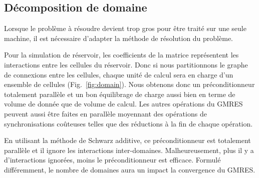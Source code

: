 \subsection{Décomposition de domaine}
Lorsque le problème à résoudre devient trop gros pour être traité sur une seule machine, il est nécessaire d'adapter la méthode de résolution du problème.

Pour la simulation de réservoir, les coefficients de la matrice représentent les interactions entre les cellules du réservoir.
%
Donc si nous partitionnons le graphe de connexions entre les cellules, chaque unité de calcul sera en charge d'un ensemble de cellules (Fig.~\ref{fig:domain}).
%
Nous obtenons donc un préconditionneur totalement parallèle et un bon équilibrage de charge aussi bien en terme de volume de donnée que de volume de calcul.
%
Les autres opérations du GMRES peuvent aussi être faites en parallèle moyennant des opérations de synchronisations coûteuses telles que des réductions à la fin de chaque opération.




En utilisant la méthode de Schwarz additive, ce préconditionneur est totalement parallèle et il ignore les interactions inter-domaines.
%
Malheureusement, plus il y a d'interactions ignorées, moins le préconditionneur est efficace.
%
Formulé différemment, le nombre de domaines aura un impact la convergence du GMRES.
